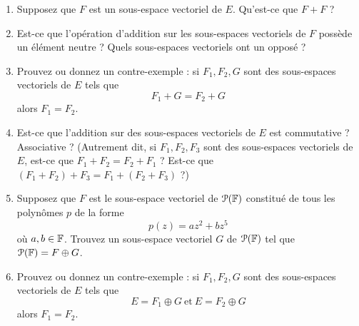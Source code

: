 \documentclass[12pt]{book}
\begin{document}
\begin{enumerate}
    \item Supposez que $F$ est un sous-espace vectoriel de $E$. Qu'est-ce que $F+F$ ?
    \item Est-ce que l'opération d'addition sur les sous-espaces vectoriels de $F$ possède un élément neutre ? Quels sous-espaces vectoriels ont un opposé ?
    \item Prouvez ou donnez un contre-exemple : si $F_1, F_2,G$ sont des sous-espaces vectoriels de $E$ tels que
    \begin{equation*}
        F_1+G=F_2+G
    \end{equation*}
    alors $F_1=F_2$.
    \item Est-ce que l'addition sur des sous-espaces vectoriels de $E$ est commutative ? Associative ? (Autrement dit, si $F_1,F_2,F_3$ sont des sous-espaces vectoriels de $E$, est-ce que $F_1+F_2=F_2+F_1$ ? Est-ce que $(F_1+F_2)+F_3=F_1+(F_2+F_3)$ ?)
    \item Supposez que $F$ est le sous-espace vectoriel de $\mathcal{P}(\mathbb{F})$ constitué de tous les polynômes $p$ de la forme
    \begin{equation*}
        p(z)=az^2+bz^5
    \end{equation*}
    où $a,b\in\mathbb{F}$. Trouvez un sous-espace vectoriel $G$ de $\mathcal{P}(\mathbb{F})$ tel que $\mathcal{P}(\mathbb{F})=F\oplus G$.
    \item Prouvez ou donnez un contre-exemple : si $F_1,F_2,G$ sont des sous-espaces vectoriels de $E$ tels que
    \begin{equation*}
        E=F_1\oplus G \mathrm{~et~} E=F_2\oplus G
    \end{equation*}
    alors $F_1=F_2$.
\end{enumerate}
\end{document}
